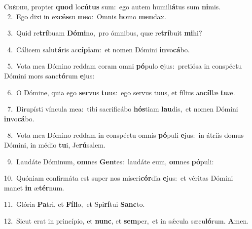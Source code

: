 \lettrine{\initial\textcolor{\initialcolor}{C}}{rédidi,} propter \textbf{quod} lo\-\textbf{cú}\-\textbf{tus} sum:~\star ego autem humili\-\textbf{á}\-tus sum \textbf{ni}\-mis.\\
{\numbfont\textcolor{\numbcolor}{~2.}}~Ego dixi in ex\-\textbf{cés}\-su \textbf{me}\-o:~\star Omnis \textbf{ho}\-mo \textbf{men}\-dax.\par
{\numbfont\textcolor{\numbcolor}{~3.}}~Quid re\-\textbf{trí}\-buam \textbf{Dó}\-\textbf{mi}no,~\star pro ómnibus, quæ re\-\textbf{trí}\-buit \textbf{mi}\-hi?\par
{\numbfont\textcolor{\numbcolor}{~4.}}~Cálicem salu\-\textbf{tá}\-ris ac\-\textbf{cí}\-\textbf{pi}am:~\star et nomen Dómini \textbf{in}\-vo\-\textbf{cá}\-bo.\par
{\numbfont\textcolor{\numbcolor}{~5.}}~Vota mea Dómino reddam coram omni \textbf{pó}\-pulo \textbf{e}\-jus:~\star pretiósa in conspéctu Dómini mors sanc\-\textbf{tó}\-rum \textbf{e}\-jus:\par
{\numbfont\textcolor{\numbcolor}{~6.}}~O Dómine, quia ego \textbf{ser}\-vus \textbf{tu}\-us:~\star ego servus tuus, et fílius an\-\textbf{cíl}\-læ \textbf{tu}\-æ.\par
{\numbfont\textcolor{\numbcolor}{~7.}}~Dirupísti víncula mea:~\dagger tibi sacrificábo \textbf{hós}\-tiam \textbf{lau}\-dis,~\star et nomen Dómini \textbf{in}\-vo\-\textbf{cá}\-bo.\par
{\numbfont\textcolor{\numbcolor}{~8.}}~Vota mea Dómino reddam in conspéctu omnis \textbf{pó}\-puli \textbf{e}\-jus:~\star in átriis domus Dómini, in médio \textbf{tu}\-i, Je\-\textbf{rú}\-salem.\par
{\numbfont\textcolor{\numbcolor}{~9.}}~Laudáte Dóminum, \textbf{om}\-nes \textbf{Gen}\-tes:~\star laudáte eum, \textbf{om}\-nes \textbf{pó}\-puli:\par
{\numbfont\textcolor{\numbcolor}{10.}}~Quóniam confirmáta est super nos miseri\-\textbf{cór}\-dia \textbf{e}\-jus:~\star et véritas Dómini manet \textbf{in} æ\-\textbf{tér}\-num.\par
{\numbfont\textcolor{\numbcolor}{11.}}~Glória \textbf{Pa}\-tri, et \textbf{Fí}\-\textbf{li}o,~\star et Spi\-\textbf{rí}\-tui \textbf{Sanc}\-to.\par
{\numbfont\textcolor{\numbcolor}{12.}}~Sicut erat in princípio, et \textbf{nunc}\-, et \textbf{sem}\-per,~\star et in sǽcula sæcu\-\textbf{ló}\-rum. \textbf{A}\-men.\par
